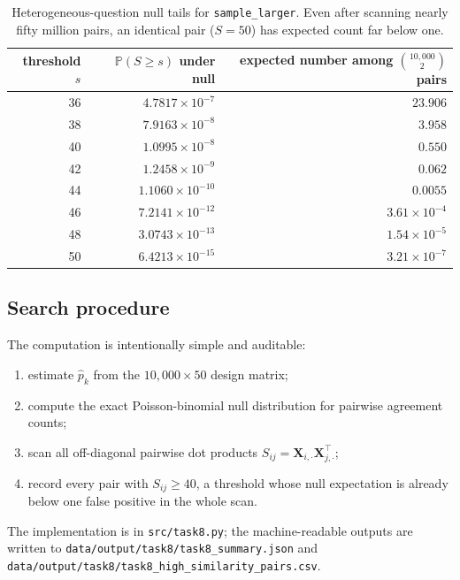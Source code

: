 \documentclass[11pt,a4paper]{article}
\newcommand{\X}{\bm{X}}
\renewcommand{\Pr}{\mathbb{P}}
\begin{document}
\begin{table}[htb]
  \centering
  \begin{tabular}{r r r}
    \toprule
    threshold $s$ & $\Pr(S\geq s)$ under null &
    expected number among $\binom{10{,}000}{2}$ pairs \\
    \midrule
    36 & $4.7817\times10^{-7}$ & $23.906$ \\
    38 & $7.9163\times10^{-8}$ & $3.958$ \\
    40 & $1.0995\times10^{-8}$ & $0.550$ \\
    42 & $1.2458\times10^{-9}$ & $0.062$ \\
    44 & $1.1060\times10^{-10}$ & $0.0055$ \\
    46 & $7.2141\times10^{-12}$ & $3.61\times10^{-4}$ \\
    48 & $3.0743\times10^{-13}$ & $1.54\times10^{-5}$ \\
    50 & $6.4213\times10^{-15}$ & $3.21\times10^{-7}$ \\
    \bottomrule
  \end{tabular}
  \caption{Heterogeneous-question null tails for
  \texttt{sample\_larger}. Even after scanning nearly fifty million
  pairs, an identical pair ($S=50$) has expected count far below one.}
  \label{tab:T8-tail}
\end{table}

\subsection{Search procedure}
The computation is intentionally simple and auditable:
\begin{enumerate}[label=(\alph*),leftmargin=2.2em]
  \item estimate $\hat p_k$ from the $10{,}000\times 50$ design matrix;
  \item compute the exact Poisson-binomial null distribution for
        pairwise agreement counts;
  \item scan all off-diagonal pairwise dot products
        $S_{ij}=\X_{i,\cdot}\X_{j,\cdot}^{\!\top}$;
  \item record every pair with $S_{ij}\geq 40$, a threshold whose
        null expectation is already below one false positive in the
        whole scan.
\end{enumerate}
The implementation is in \texttt{src/task8.py}; the machine-readable
outputs are written to
\texttt{data/output/task8/task8\_summary.json} and
\texttt{data/output/task8/task8\_high\_similarity\_pairs.csv}.
\end{document}
